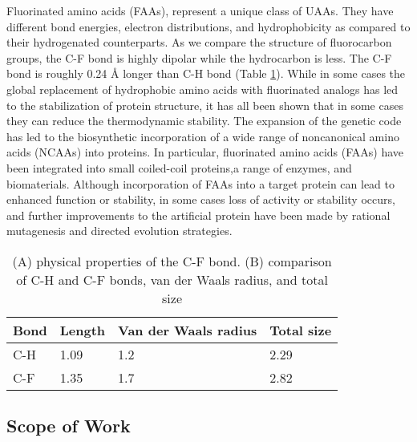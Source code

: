 \begin{refsection}
Fluorinated amino acids (FAAs), represent a unique class of UAAs. They have
different bond energies, electron distributions, and
hydrophobicity\cite{Biffinger2004} as compared to their hydrogenated
counterparts. As we compare the structure of fluorocarbon groups, the C-F bond
is highly dipolar while the hydrocarbon is less. The C-F bond is roughly 0.24
{\AA} longer than C-H bond (Table \ref{tab:c-fbond}).\cite{Tang2001} While in
some cases the global replacement of hydrophobic amino acids with fluorinated
analogs has led to the stabilization of protein structure\cite{Biffinger2004},
it has all been shown that in some cases they can reduce the thermodynamic
stability.\cite{Panchenko2006b} The expansion of the genetic code has led to
the biosynthetic incorporation of a wide range of noncanonical amino acids
(NCAAs) into proteins.\cite{Voloshchuk2010} In particular, fluorinated amino
acids (FAAs) have been integrated into small coiled-coil
proteins,\cite{Montclare2009b,Tang2001}a range of
enzymes,\cite{Voloshchuk2009,Panchenko2006b,Voloshchuk2007b,Mehta2011b,Hammill2007}
and biomaterials.\cite{Yuvienco2012b} Although incorporation of FAAs into a
target protein can lead to enhanced function or stability, in some cases loss
of activity or stability occurs, and further improvements to the artificial
protein have been made by rational mutagenesis\cite{Voloshchuk2007b} and
directed evolution strategies.\cite{Montclare2006b}
\begin{table}[h!]
\centering
\begin{tabular}{ llll }
  \hline
  Bond & Length & Van der Waals radius & Total size \\
  \hline

  C-H & 1.09 & 1.2 & 2.29 \\
  C-F & 1.35 & 1.7 & 2.82 \\

  \hline
\end{tabular}
\caption{(A) physical properties of the C-F bond. (B) comparison of C-H and C-F
bonds, van der Waals radius, and total size} \label{tab:c-fbond}
\end{table}

\subsection{Scope of Work}


\end{refsection}
